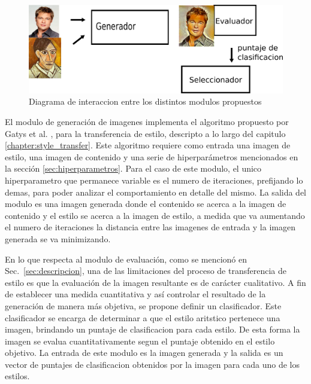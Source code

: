 \documentclass[a4paper,11pt,spanish]{book}
\begin{document}
    \begin{figure}[h]
      \begin{center}
	\includegraphics[width=\linewidth]{./img/diagrama.png}
      \end{center}
      \caption{Diagrama de interaccion entre los distintos modulos propuestos}
      \label{fig:diagrama}
    \end{figure}

    
    El modulo de generación de imagenes implementa el algoritmo propuesto por Gatys et al. \cite{Gatys:Neural_Style}, para la transferencia de estilo, descripto a lo largo del 
    capitulo \ref{chapter:style_transfer}. 
    Este algoritmo requiere como entrada una imagen de estilo, una imagen de contenido y una serie de hiperparámetros mencionados en la sección \ref{sec:hiperparametros}.
    Para el caso de este modulo, el unico hiperparametro que permanece variable es el numero de iteraciones, prefijando lo demas, para poder analizar el comportamiento
    en detalle del mismo.
    La salida del modulo es una imagen generada donde el contenido se acerca a la imagen de contenido y el estilo se acerca a la imagen de estilo, a medida
    que va aumentando el numero de iteraciones la distancia entre las imagenes de entrada y la imagen generada se va minimizando. 

    En lo que respecta al modulo de evaluación, como se mencionó en Sec.~\ref{sec:descripcion}, una de las limitaciones del proceso de transferencia de estilo es que la evaluación de
    la imagen resultante es de carácter cualitativo. A fin de establecer una medida cuantitativa y así controlar el resultado de la generación de
    manera más objetiva, se propone definir un clasificador. Este clasificador se encarga de determinar a que el estilo aritstico pertenece una imagen, brindando un puntaje 
    de clasificacion para cada estilo.
    De esta forma la imagen se evalua cuantitativamente segun el puntaje obtenido en el estilo objetivo.
    La entrada de este modulo es la imagen generada y la salida es un vector de puntajes de clasificacion obtenidos por la imagen para cada uno de los estilos.
\end{document}
